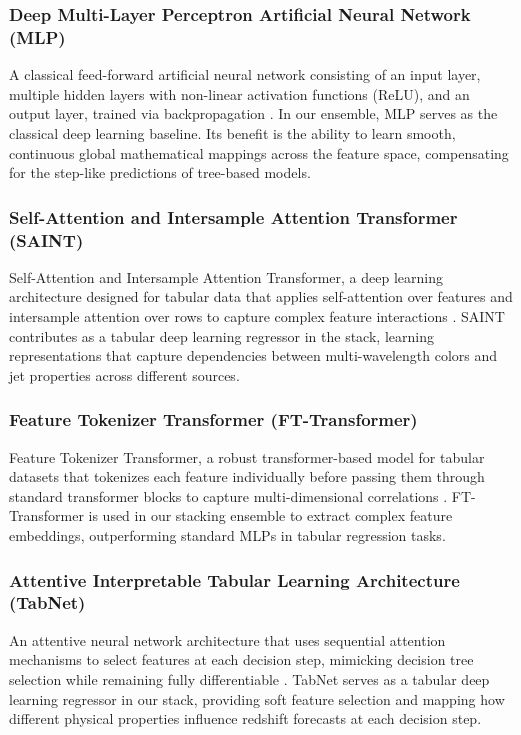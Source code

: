 \documentclass[twocolumn,linenumbers,floatfix]{aastex701}
\begin{document}
\subsubsection{Deep Multi-Layer Perceptron Artificial Neural Network (MLP)}
A classical feed-forward artificial neural network consisting of an input layer, multiple hidden layers with non-linear activation functions (ReLU), and an output layer, trained via backpropagation \citep{Rumelhart1986}. In our ensemble, MLP serves as the classical deep learning baseline. Its benefit is the ability to learn smooth, continuous global mathematical mappings across the feature space, compensating for the step-like predictions of tree-based models.

\subsubsection{Self-Attention and Intersample Attention Transformer (SAINT)}
Self-Attention and Intersample Attention Transformer, a deep learning architecture designed for tabular data that applies self-attention over features and intersample attention over rows to capture complex feature interactions \citep{Somepalli2021}. SAINT contributes as a tabular deep learning regressor in the stack, learning representations that capture dependencies between multi-wavelength colors and jet properties across different sources.

\subsubsection{Feature Tokenizer Transformer (FT-Transformer)}
Feature Tokenizer Transformer, a robust transformer-based model for tabular datasets that tokenizes each feature individually before passing them through standard transformer blocks to capture multi-dimensional correlations \citep{Gorishniy2021}. FT-Transformer is used in our stacking ensemble to extract complex feature embeddings, outperforming standard MLPs in tabular regression tasks.

\subsubsection{Attentive Interpretable Tabular Learning Architecture (TabNet)}
An attentive neural network architecture that uses sequential attention mechanisms to select features at each decision step, mimicking decision tree selection while remaining fully differentiable \citep{Arik2021}. TabNet serves as a tabular deep learning regressor in our stack, providing soft feature selection and mapping how different physical properties influence redshift forecasts at each decision step.
\end{document}
